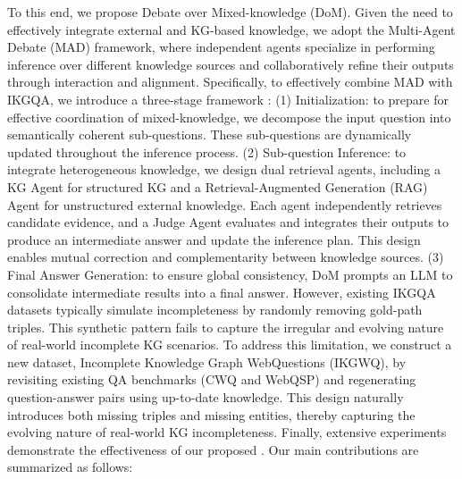 
To this end, we propose Debate over Mixed-knowledge (DoM). Given the need to effectively integrate external and KG-based knowledge, we adopt the Multi-Agent Debate (MAD) framework, where independent agents specialize in performing inference over different knowledge sources and collaboratively refine their outputs through interaction and alignment. Specifically, to effectively combine MAD with IKGQA, we introduce a three-stage framework : (1) Initialization: to prepare for effective coordination of mixed-knowledge, we decompose the input question into semantically coherent sub-questions. These sub-questions are dynamically updated throughout the inference process. (2) Sub-question Inference: to integrate heterogeneous knowledge, we design dual retrieval agents, including a KG Agent for structured KG and a Retrieval-Augmented Generation (RAG) Agent for unstructured external knowledge. Each agent independently retrieves candidate evidence, and a Judge Agent evaluates and integrates their outputs to produce an intermediate answer and update the inference plan. This design enables mutual correction and complementarity between knowledge sources. (3) Final Answer Generation: to ensure global consistency, DoM prompts an LLM to consolidate intermediate results into a final answer. However, existing IKGQA datasets typically simulate incompleteness by randomly removing gold-path triples. This synthetic pattern fails to capture the irregular and evolving nature of real-world incomplete KG scenarios. To address this limitation, we construct a new dataset, Incomplete Knowledge Graph WebQuestions (IKGWQ), by revisiting existing QA benchmarks (CWQ and WebQSP) and regenerating question-answer pairs using up-to-date knowledge. This design naturally introduces both missing triples and missing entities, thereby capturing the evolving nature of real-world KG incompleteness.
Finally, extensive experiments demonstrate the effectiveness of our proposed \shortname. Our main contributions are summarized as follows:




